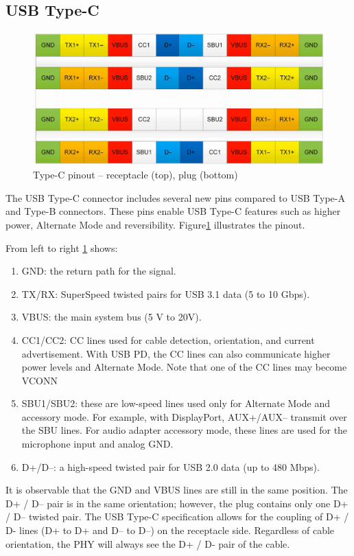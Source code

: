\subsection{USB Type-C}
\begin{figure}[htb]
    \centering
    \includegraphics[width=0.7\linewidth]{Chapter2/typec_plugrecep.png}
    \caption{ Type-C pinout – receptacle (top), plug (bottom) \cite{enos2022primer}}
    \label{fig:typec_plug}
\end{figure}
The USB Type-C connector includes several new pins 
compared to USB Type-A and Type-B connectors. These 
pins enable USB Type-C features such as higher power, 
Alternate Mode and reversibility. Figure\ref{fig:typec_plug} illustrates the pinout.

From left to right \ref{fig:typec_plug} shows:
 \begin{enumerate}
     \item GND: the return path for the signal.
     \item TX/RX: SuperSpeed twisted pairs for USB 3.1 data (5 to 10 Gbps).
     \item VBUS: the main system bus (5 V to 20V).
     \item CC1/CC2: CC lines used for cable detection, orientation, and current advertisement. With USB PD, the CC lines can also communicate higher power levels and Alternate Mode. Note that one of the CC lines may become VCONN
     \item SBU1/SBU2: these are low-speed lines used only for Alternate Mode and accessory mode. For example, with DisplayPort, AUX+/AUX– transmit over the SBU lines. For audio adapter accessory mode, these lines are used for the microphone input and analog GND.
     \item D+/D–: a high-speed twisted pair for USB 2.0 data (up to 480 Mbps).
 \end{enumerate}
 It is observable that the GND and VBUS lines are still in the same position. The D+ / D– pair is in the same orientation; however, the plug contains only one D+ / D– twisted pair. The USB Type-C specification allows for the coupling of D+ / D- lines (D+ to D+ and D– to D–) on the receptacle side. Regardless of cable orientation, the PHY will always see the D+ / D- pair of the cable. 
 

